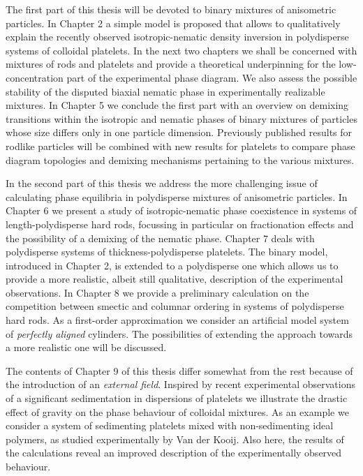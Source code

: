 \documentclass[amssymb]{revtex4}
\begin{document}
The first part of this thesis will be devoted to binary mixtures of anisometric particles.
In Chapter 2 a simple model is proposed that allows to qualitatively explain
the recently observed isotropic-nematic density inversion in polydisperse systems of colloidal platelets.
In the next two chapters  we shall be concerned with mixtures of rods and platelets and
provide a theoretical underpinning for the low-concentration part of the experimental 
phase diagram. We also assess the possible stability of the disputed biaxial nematic phase
in experimentally realizable mixtures.
In Chapter 5 we conclude the first part with  an overview on demixing transitions
within the isotropic and nematic phases of binary mixtures of particles
whose size differs only in one particle dimension. Previously published results for rodlike particles
will be combined with new results for platelets to compare phase diagram topologies and
demixing mechanisms pertaining to the various mixtures.
	
In the second part of this thesis we address the more challenging issue of calculating 
phase equilibria in polydisperse mixtures of anisometric particles.
In Chapter 6 we present a study of isotropic-nematic phase coexistence in systems of 
length-polydisperse hard rods, focussing in particular on fractionation effects and
the possibility of a demixing of the nematic phase.
Chapter 7 deals with polydisperse systems of thickness-polydisperse 
platelets. The binary model, introduced in Chapter 2, is extended to a polydisperse
one which allows us to provide a more realistic, albeit still qualitative, description of the experimental observations. 
In Chapter 8 we provide a preliminary 
calculation on the competition
between smectic and columnar ordering in systems of polydisperse hard rods.  As a first-order
approximation we consider an artificial model system of {\em perfectly aligned} cylinders. The  possibilities of extending the approach towards a more realistic one will be discussed.


The contents of  Chapter 9 of this thesis differ somewhat from the  rest because of the introduction of an  {\em external field}.
Inspired by recent experimental observations of a significant sedimentation in dispersions of platelets 
 we illustrate the drastic effect of gravity 
 on the phase behaviour of colloidal mixtures. As an example we consider a system
of sedimenting platelets mixed with non-sedimenting ideal polymers, as studied
experimentally by Van der Kooij. Also here,  the results of the calculations 
reveal an improved description of the experimentally observed
behaviour. 	
\end{document}
